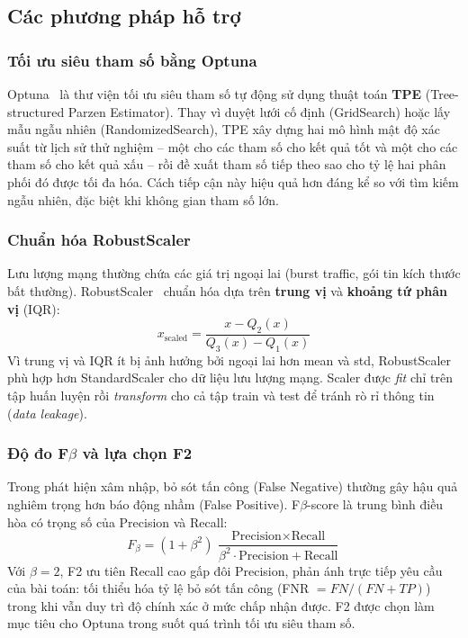 \subsection{Các phương pháp hỗ trợ}

\subsubsection{Tối ưu siêu tham số bằng Optuna}

Optuna~\cite{optuna2019} là thư viện tối ưu siêu tham số tự động sử dụng thuật toán \textbf{TPE} (Tree-structured Parzen Estimator). Thay vì duyệt lưới cố định (GridSearch) hoặc lấy mẫu ngẫu nhiên (RandomizedSearch), TPE xây dựng hai mô hình mật độ xác suất từ lịch sử thử nghiệm -- một cho các tham số cho kết quả tốt và một cho các tham số cho kết quả xấu -- rồi đề xuất tham số tiếp theo sao cho tỷ lệ hai phân phối đó được tối đa hóa. Cách tiếp cận này hiệu quả hơn đáng kể so với tìm kiếm ngẫu nhiên, đặc biệt khi không gian tham số lớn.

\subsubsection{Chuẩn hóa RobustScaler}

Lưu lượng mạng thường chứa các giá trị ngoại lai (burst traffic, gói tin kích thước bất thường). RobustScaler~\cite{pedregosa2011scikit} chuẩn hóa dựa trên \textbf{trung vị} và \textbf{khoảng tứ phân vị} (IQR):
\begin{equation}
    x_{\text{scaled}} = \frac{x - Q_2(x)}{Q_3(x) - Q_1(x)}
\end{equation}
Vì trung vị và IQR ít bị ảnh hưởng bởi ngoại lai hơn mean và std, RobustScaler phù hợp hơn StandardScaler cho dữ liệu lưu lượng mạng. Scaler được \textit{fit} chỉ trên tập huấn luyện rồi \textit{transform} cho cả tập train và test để tránh rò rỉ thông tin (\textit{data leakage}).

\subsubsection{Độ đo F$\beta$ và lựa chọn F2}

Trong phát hiện xâm nhập, bỏ sót tấn công (False Negative) thường gây hậu quả nghiêm trọng hơn báo động nhầm (False Positive). F$\beta$-score là trung bình điều hòa có trọng số của Precision và Recall:
\begin{equation}
    F_\beta = (1+\beta^2)\, \frac{\text{Precision} \times \text{Recall}}{\beta^2 \cdot \text{Precision} + \text{Recall}}
\end{equation}
Với $\beta = 2$, F2 ưu tiên Recall cao gấp đôi Precision, phản ánh trực tiếp yêu cầu của bài toán: tối thiểu hóa tỷ lệ bỏ sót tấn công (FNR $= FN/(FN+TP)$) trong khi vẫn duy trì độ chính xác ở mức chấp nhận được. F2 được chọn làm mục tiêu cho Optuna trong suốt quá trình tối ưu siêu tham số.

